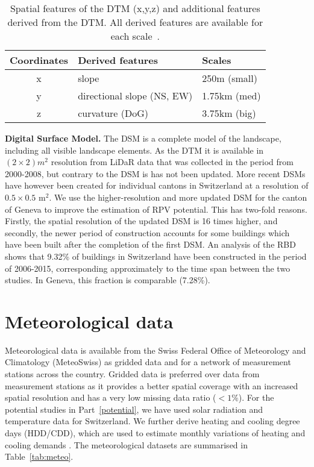 \begin{table}[htb]
\centering
\footnotesize
\begin{tabular}{cll}
\hline
\textbf{Coordinates} & \textbf{Derived features} & \textbf{Scales} \\ \hline
x                    & slope                           & 250m (small)    \\
y                    & directional slope (NS, EW)      & 1.75km (med)    \\
z                    & curvature (DoG)                 & 3.75km (big)    \\ \hline
\end{tabular}
\caption{Spatial features of the DTM (x,y,z) and additional features derived from the DTM. All derived features are available for each scale~\cite{robert_spatial_2012}.}
\label{tab:DTM_ftrs}
\end{table}

\textbf{Digital Surface Model.} The DSM is a complete model of the landscape, including all visible landscape elements. As the DTM it is available  in $(2\times2)m^2$ resolution from LiDaR data that was collected in the period from 2000-2008, but contrary to the DSM is has not been updated. More recent DSMs have however been created for individual cantons in Switzerland at a resolution of $0.5\times0.5$ m$^2$. 
%
We use the higher-resolution and more updated DSM for the canton of Geneva to improve the estimation of RPV potential.
This has two-fold reasons. Firstly, the spatial resolution of the updated DSM is 16 times higher, and secondly, the newer period of construction accounts for some buildings which have been built after the completion of the first DSM.
An analysis of the RBD shows that 9.32\% of buildings in Switzerland have been constructed in the period of 2006-2015, corresponding approximately to the time span between the two studies. In Geneva, this fraction is comparable (7.28\%).


\section{Meteorological data}
\label{data_meteo}
Meteorological data is available from the Swiss Federal Office of Meteorology and Climatology (MeteoSwiss) as gridded data and for a network of measurement stations across the country. 
Gridded data is preferred over data from measurement stations as it provides a better spatial coverage with an increased spatial resolution and has a very low missing data ratio ($<1\%$). 
For the potential studies in Part~\ref{potential}, we have used solar radiation and temperature data for Switzerland. We further derive heating and cooling degree days (HDD/CDD), which are used to estimate monthly variations of heating and cooling demands \cite{stadler_contribution_2018}. The meteorological datasets are summarised in Table~\ref{tab:meteo}.

